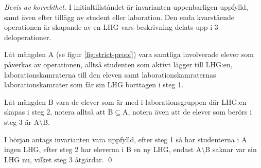 \begin{proof}[Bevis av korrekthet]
I initialtillståndet är invarianten uppenbarligen uppfylld, samt även efter tillägg av student eller laboration. Den enda kvarstående operationen är skapande av en LHG vars beskrivning delats upp i 3 deloperationer. 

Låt mängden A (se figur \ref{fig:strict-proof}) vara samtliga involverade elever som påverkas av operationen, alltså studenten som aktivt lägger till LHG:en, laborationskamraterna till den eleven samt laborationskamraternas laborationskamrater som får sin LHG borttagen i steg 1. 

Låt mängden B vara de elever som är med i laborationsgruppen där LHG:en skapas i steg 2, notera alltså att B$\subseteq$A, notera även att de elever som berörs i steg 3 är A$\setminus$B.

I början antags invarianten vara uppfylld, efter steg 1 så har studenterna i A ingen LHG, efter steg 2 har eleverna i B en ny LHG, endast A$\setminus$B saknar var sin LHG nu, vilket steg 3 åtgärdar. \qed
 

\end{proof}
